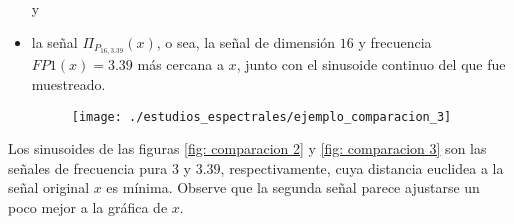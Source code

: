 \begin{ejemplo}
\begin{itemize}
	y
	\item la señal $\Pi_{P_{16, 3.39}}(x)$, o sea, la señal de
	dimensión $16$ y frecuencia $FP1(x)=3.39$ más cercana a $x$, junto con
	el sinusoide continuo del que fue muestreado.
	\begin{figure}[H]
			\centering
			\texttt{[image: ./estudios\_espectrales/ejemplo\_comparacion\_3]} 
		\end{figure}		
\end{itemize}


Los sinusoides de las figuras \ref{fig: comparacion 2} y
\ref{fig: comparacion 3}
son las señales de frecuencia pura
$3$ y $3.39$, respectivamente, cuya distancia euclidea
a la señal original $x$ es mínima. Observe que la segunda
señal parece ajustarse un poco mejor a la gráfica de $x$.

\final
\end{ejemplo}